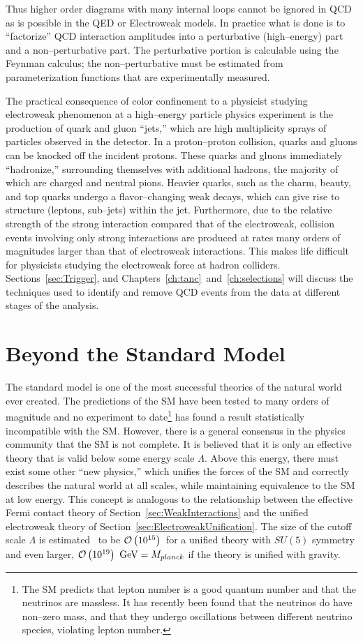 Thus higher order diagrams with many internal loops cannot be ignored in QCD\@
as is possible in the QED or Electroweak models.  In practice what is done is to
``factorize'' QCD interaction amplitudes into a perturbative (high--energy) part
and a non--perturbative part.  The perturbative portion is calculable using the
Feynman calculus; the non--perturbative must be estimated from parameterization
functions that are experimentally measured.

The practical consequence of color confinement to a physicist studying
electroweak phenomenon at a high--energy
particle physics experiment is the production of quark and gluon ``jets,'' which
are high multiplicity sprays of particles observed in the detector.  In a
proton--proton collision, quarks and gluons can be knocked off the incident
protons.  These quarks and gluons immediately ``hadronize,'' surrounding
themselves with additional hadrons, the majority of which are charged and
neutral pions.  Heavier quarks, such as the charm, beauty, and top quarks
undergo a flavor--changing weak decays, which can give rise to structure
(leptons, sub--jets) within the jet.  Furthermore, due to the relative strength
of the strong interaction compared that of the electroweak, collision events
involving only strong interactions are produced at rates many orders of
magnitudes larger than that of electroweak interactions.  This makes life
difficult for physicists studying the electroweak force at hadron colliders.
Sections~\ref{sec:Trigger}, and Chapters~\ref{ch:tanc}~and~\ref{ch:selections}
will discuss the techniques used to identify and remove QCD events from the data
at different stages of the analysis.

\section{Beyond the Standard Model}
\label{sec:BSM} The standard model is one of the most successful theories of the
natural world ever created.  The predictions of the SM have been tested to many
orders of magnitude and no experiment to date\footnote{The SM predicts that
lepton number is a good quantum number and that the neutrinos are massless.  It
has recently been found that the neutrinos do have non--zero mass, and that they
undergo oscillations between different neutrino species, violating lepton
number.} has found a result statistically incompatible with the SM\@. However,
there is a general consensus in the physics community that the SM is not
complete. It is believed that it is only an effective theory that is valid below
some energy scale $\Lambda$.  Above this energy, there must exist some other
``new physics,'' which unifies the forces of the SM and correctly describes the
natural world at all scales, while maintaining equivalence to the SM at low
energy.  This concept is analogous to the relationship between the effective
Fermi contact theory of Section~\ref{sec:WeakInteractions} and the unified
electroweak theory of Section~\ref{sec:ElectroweakUnification}. The size of the
cutoff scale $\Lambda$ is estimated~\cite{Morii:SMandBSM} to be
$\mbox{\ensuremath{\mathcal{O}\left(10^{15}\right)}}$~\GeV for a unified theory with $SU(5)$ symmetry and even
larger, $\mbox{\ensuremath{\mathcal{O}\left(10^{19}\right)}}~\,\text{Ge\hspace{-.08em}V} = M_{planck}$ if the theory is unified with
gravity.  

